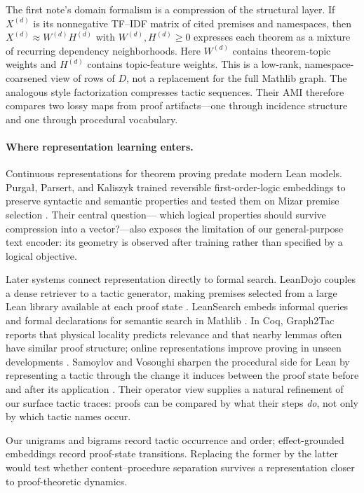 \documentclass[11pt]{article}
\begin{document}
The first note's domain formalism is a compression of the structural layer.  If $X^{(d)}$ is its
nonnegative TF--IDF matrix of cited premises and namespaces, then
$X^{(d)}\approx W^{(d)}H^{(d)}$ with $W^{(d)},H^{(d)}\geq0$ expresses each theorem as a mixture of
recurring dependency neighborhoods.  Here $W^{(d)}$ contains theorem-topic weights and $H^{(d)}$
contains topic-feature weights.  This is a low-rank, namespace-coarsened view of rows of $D$, not a
replacement for the full Mathlib graph.  The analogous style factorization compresses tactic
sequences.  Their AMI therefore compares two lossy maps from proof artifacts---one through
incidence structure and one through procedural vocabulary.

\paragraph{Where representation learning enters.}
Continuous representations for theorem proving predate modern Lean models.  Purga\l, Parsert,
and Kaliszyk trained reversible first-order-logic embeddings to preserve syntactic and semantic
properties and tested them on Mizar premise selection \cite{vectors}.  Their central question---
which logical properties should survive compression into a vector?---also exposes the limitation
of our general-purpose text encoder: its geometry is observed after training rather than specified
by a logical objective.

Later systems connect representation directly to formal search.  LeanDojo couples a dense retriever
to a tactic generator, making premises selected from a large Lean library available at each proof
state \cite{leandojo}.  LeanSearch embeds informal queries and formal declarations for semantic
search in Mathlib \cite{leansearch}.  In Coq, Graph2Tac reports that physical locality predicts
relevance and that nearby lemmas often have similar proof structure; online representations improve
proving in unseen developments \cite{graph2tac}.  Samoylov and Vosoughi sharpen the procedural side
for Lean by representing a tactic through the change it induces between the proof state before and
after its application \cite{operators}.  Their operator view supplies a natural refinement of our
surface tactic traces: proofs can be compared by what their steps \emph{do}, not only by which tactic
names occur.

Our unigrams and bigrams record tactic occurrence and order; effect-grounded embeddings record
proof-state transitions.  Replacing the former by the latter would test whether content--procedure
separation survives a representation closer to proof-theoretic dynamics.
\end{document}
